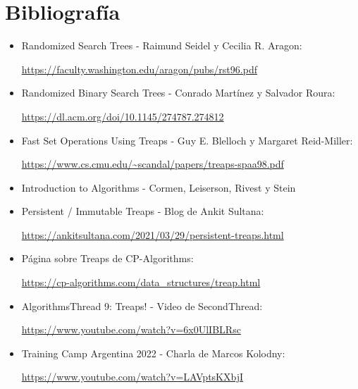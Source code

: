 \section{Bibliografía}

\begin{itemize}
\item Randomized Search Trees - Raimund Seidel y Cecilia R. Aragon: 

\url{https://faculty.washington.edu/aragon/pubs/rst96.pdf}

\item Randomized Binary Search Trees - Conrado Martínez y Salvador Roura: 

\url{https://dl.acm.org/doi/10.1145/274787.274812}

\item Fast Set Operations Using Treaps - Guy E. Blelloch y Margaret Reid-Miller: 

\url{https://www.cs.cmu.edu/~scandal/papers/treaps-spaa98.pdf}

\item Introduction to Algorithms - Cormen, Leiserson, Rivest y Stein

\item Persistent / Immutable Treaps - Blog de Ankit Sultana: 

\url{https://ankitsultana.com/2021/03/29/persistent-treaps.html}

\item Página sobre Treaps de CP-Algorithms: 

\url{https://cp-algorithms.com/data_structures/treap.html}

\item AlgorithmsThread 9: Treaps! - Video de SecondThread: 

\url{https://www.youtube.com/watch?v=6x0UlIBLRsc}

\item Training Camp Argentina 2022 - Charla de Marcos Kolodny: 

\url{https://www.youtube.com/watch?v=LAVptsKXbjI}
\end{itemize}